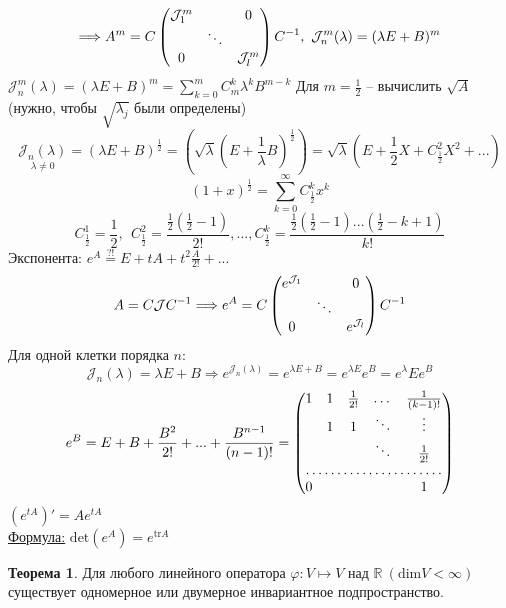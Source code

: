 \documentclass[a4paper, 12pt]{article}
\theoremstyle{definition}
\newtheorem*{theorem}{Теорема}
\begin{document}
    $$\Longrightarrow A^m = C\begin{pmatrix}
        \mathcal{J}_1^m & \null & 0\\
        \null & \ddots & \null\\
        0 & \null & \mathcal{J}_l^m
    \end{pmatrix}C^{-1},\ \mathcal{J}_n^m(\lambda) = 
    (\lambda E + B)^m 
    $$
    $\mathcal{J}_n^m(\lambda) = (\lambda E + B)^m = 
    \sum\limits_{k=0}^{m}C_m^k \lambda^k B^{m-k}$
    \newpage
    Для $m = \frac{1}{2}$ -- вычислить $\sqrt{A}$ (нужно,
    чтобы $\sqrt{\lambda_j}$ были определены)
    $$\underset{\lambda \neq 0}{\mathcal{J}_n(\lambda)}  = (\lambda E + B)^{\frac{1}{2}} =
    (\sqrt{\lambda}(E + \frac{1}{\lambda}B)^{\frac{1}{2}}) = 
    \sqrt{\lambda}(E + \frac{1}{2}X + C_{\frac{1}{2}}^2X^2 +...)$$
    $$(1 + x)^{\frac{1}{2}} = \sum\limits_{k=0}^{\infty}
    C_{\frac{1}{2}}^kx^k$$
    $$C_{\frac{1}{2}}^1 = \frac{1}{2},\ \ C_{\frac{1}{2}}^2 = 
    \frac{\frac{1}{2}(\frac{1}{2}-1)}{2!},...,C_{\frac{1}{2}}^k =
    \frac{\frac{1}{2}(\frac{1}{2}-1)...(\frac{1}{2}-k+1)}{k!}$$
    Экспонента:
    $e^A \overset{?!}{=} E + tA + t^2\frac{A}{2!}+...$
    $$A = C \mathcal{J}C^{-1} \Longrightarrow e^A = C
    \begin{pmatrix}
        e^{\mathcal{J}_1} & \null & 0\\
        \null & \ddots & \null\\
        0 & \null & e^{\mathcal{J}_l}
    \end{pmatrix}C^{-1}$$
    Для одной клетки порядка $n$:
    $$\mathcal{J}_n(\lambda) = \lambda E + B \Longrightarrow 
    e^{\mathcal{J}_n(\lambda)} = e^{\lambda E + B} = 
    e^{\lambda E}e^B = e^\lambda E e^B$$
    $$e^B = E + B + \frac{B^2}{2!} +...+ \frac{B^{n-1}}{(n-1)!} = 
    \begin{pmatrix}
        1 & 1 & \frac{1}{2!} & \dots & \frac{1}{(k-1)!}\\
        \null & 1 & 1 & \ddots & \vdots\\
        \null & \null & \null & \ddots & \frac{1}{2!}\\
        \hdotsfor{5}\\
        0 & \null & \null & \null & 1
    \end{pmatrix}$$
    $(e^{tA})' = Ae^{tA}$\\
    \underline{Формула:} $\text{det}(e^A) = e^{\text{tr}A}$
    \begin{theorem}
        Для любого линейного оператора $\varphi: V \longmapsto 
        V$ над $\mathbb{R}\ (\text{dim}V < \infty)$ существует
        одномерное или двумерное инвариантное подпространство.
    \end{theorem}
\end{document}
